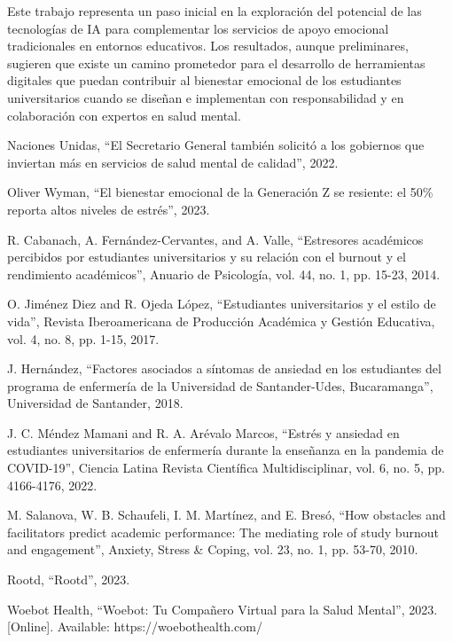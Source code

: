 \documentclass[conference]{IEEEtran}
\begin{document}
Este trabajo representa un paso inicial en la exploración del potencial de las tecnologías de IA para complementar los servicios de apoyo emocional tradicionales en entornos educativos. Los resultados, aunque preliminares, sugieren que existe un camino prometedor para el desarrollo de herramientas digitales que puedan contribuir al bienestar emocional de los estudiantes universitarios cuando se diseñan e implementan con responsabilidad y en colaboración con expertos en salud mental.

\begin{thebibliography}{00}
 Naciones Unidas, ``El Secretario General también solicitó a los gobiernos que inviertan más en servicios de salud mental de calidad'', 2022.

 Oliver Wyman, ``El bienestar emocional de la Generación Z se resiente: el 50\% reporta altos niveles de estrés'', 2023.

 R. Cabanach, A. Fernández-Cervantes, and A. Valle, ``Estresores académicos percibidos por estudiantes universitarios y su relación con el burnout y el rendimiento académicos'', Anuario de Psicología, vol. 44, no. 1, pp. 15-23, 2014.

 O. Jiménez Diez and R. Ojeda López, ``Estudiantes universitarios y el estilo de vida'', Revista Iberoamericana de Producción Académica y Gestión Educativa, vol. 4, no. 8, pp. 1-15, 2017.

 J. Hernández, ``Factores asociados a síntomas de ansiedad en los estudiantes del programa de enfermería de la Universidad de Santander-Udes, Bucaramanga'', Universidad de Santander, 2018.

 J. C. Méndez Mamani and R. A. Arévalo Marcos, ``Estrés y ansiedad en estudiantes universitarios de enfermería durante la enseñanza en la pandemia de COVID-19'', Ciencia Latina Revista Científica Multidisciplinar, vol. 6, no. 5, pp. 4166-4176, 2022.

 M. Salanova, W. B. Schaufeli, I. M. Martínez, and E. Bresó, ``How obstacles and facilitators predict academic performance: The mediating role of study burnout and engagement'', Anxiety, Stress \& Coping, vol. 23, no. 1, pp. 53-70, 2010.

 Rootd, ``Rootd'', 2023.

 Woebot Health, ``Woebot: Tu Compañero Virtual para la Salud Mental'', 2023. [Online]. Available: https://woebothealth.com/


\end{thebibliography}
\end{document}
